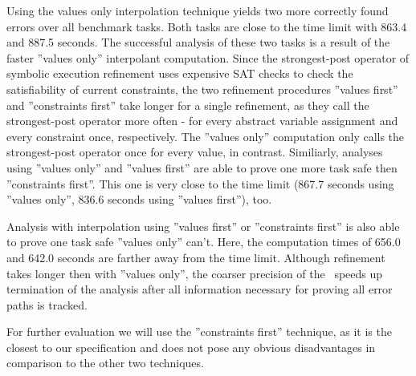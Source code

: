 Using the values only interpolation technique yields two more correctly found errors over all benchmark tasks.
Both tasks are close to the time limit with 863.4 and 887.5 seconds.
The successful analysis of these two tasks is a result of the faster ''values only'' interpolant computation.
Since the strongest-post operator of symbolic execution refinement uses expensive SAT checks to check the satisfiability of current constraints, the two refinement procedures
''values first'' and ''constraints first'' take longer for a single refinement, as they call the strongest-post operator more often - for every abstract variable assignment and every constraint once, respectively.
The ''values only'' computation only calls the strongest-post operator once for every value, in contrast.
Similiarly, analyses using ''values only'' and ''values first'' are able to prove one more task safe then ''constraints first''.
This one is very close to the time limit (867.7 seconds using ''values only'', 836.6 seconds using ''values first''), too.

Analysis with interpolation using ''values first'' or ''constraints first'' is also able to prove one task safe ''values only'' can't.
Here, the computation times of 656.0 and 642.0 seconds are farther away from the time limit.
Although refinement takes longer then with ''values only'', the coarser precision of the \constraintsCPA\ speeds up termination of the analysis after all information necessary for proving all error paths is tracked.

For further evaluation we will use the ''constraints first'' technique, as it is the closest to our specification and does not pose any obvious disadvantages in comparison to the other two techniques.




